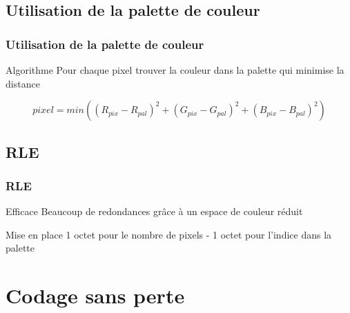 \documentclass{beamer}
\begin{document}
\subsection{Utilisation de la palette de couleur}
\begin{frame}
  \frametitle{Utilisation de la palette de couleur}
  \begin{block}{Algorithme}
    Pour chaque pixel trouver la couleur dans la palette qui minimise la distance
  \end{block}
  \begin{block}{}
    $$ pixel = min((R_{pix} - R_{pal})^2 + (G_{pix} - G_{pal})^2 + (B_{pix} - B_{pal})^2) $$
  \end{block}
\end{frame}
\subsection{RLE}
  \begin{frame}
    \frametitle{RLE}
    \begin{block}{Efficace}
      Beaucoup de redondances grâce à un espace de couleur réduit
    \end{block}
    \begin{block}{Mise en place}
      1 octet pour le nombre de pixels - 1 octet pour l'indice dans la palette
    \end{block}
  \end{frame}
\section{Codage sans perte}
\subsection{}
\end{document}
